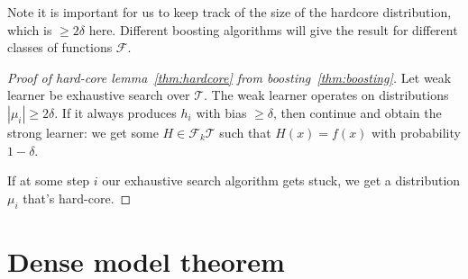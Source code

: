Note it is important for us to keep track of the size of the hardcore distribution, which is $\ge 2\delta$ here.
Different boosting algorithms will give the result for different classes of functions $\mathcal F$.

\begin{proof}[Proof of hard-core lemma~\ref{thm:hardcore} from boosting~\ref{thm:boosting}]
Let weak learner be exhaustive search over $\mathcal T$. The weak learner operates on distributions $|\mu_i|\ge 2\delta$. If it always produces $h_i$ with bias $\ge \delta$, then continue  and obtain the strong learner: we get some $H\in \mathcal F_k \mathcal T$ such that  $H(x)=f(x)$ with probability $1-\delta$. 

If at some step $i$ our exhaustive search algorithm gets stuck, we get a distribution $\mu_i$ that's hard-core.
\end{proof}




\section{Dense model theorem}


